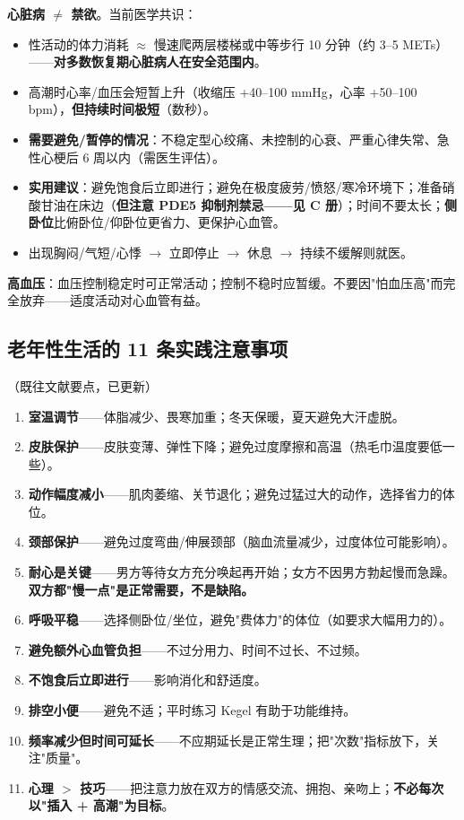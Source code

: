 \documentclass[12pt,UTF8,openany]{ctexbook}
\begin{document}
\textbf{心脏病 $\ne$ 禁欲}。当前医学共识：

\begin{itemize}[leftmargin=2em,itemsep=0.3em]
  \item 性活动的体力消耗 $\approx$ 慢速爬两层楼梯或中等步行 10 分钟（约 3--5 METs）——\textbf{对多数恢复期心脏病人在安全范围内}。
  \item 高潮时心率/血压会短暂上升（收缩压 +40--100 mmHg，心率 +50--100 bpm），\textbf{但持续时间极短}（数秒）。
  \item \textbf{需要避免/暂停的情况}：不稳定型心绞痛、未控制的心衰、严重心律失常、急性心梗后 6 周以内（需医生评估）。
  \item \textbf{实用建议}：避免饱食后立即进行；避免在极度疲劳/愤怒/寒冷环境下；准备硝酸甘油在床边（\textbf{但注意 PDE5 抑制剂禁忌——见 C 册}）；时间不要太长；\textbf{侧卧位}比俯卧位/仰卧位更省力、更保护心血管。
  \item 出现胸闷/气短/心悸 $\to$ 立即停止 $\to$ 休息 $\to$ 持续不缓解则就医。
\end{itemize}

\noindent\textbf{高血压}：血压控制稳定时可正常活动；控制不稳时应暂缓。不要因"怕血压高"而完全放弃——适度活动对心血管有益。

\subsection*{老年性生活的 11 条实践注意事项}（既往文献要点，已更新）

\begin{enumerate}[leftmargin=2em,itemsep=0.3em]
  \item \textbf{室温调节}——体脂减少、畏寒加重；冬天保暖，夏天避免大汗虚脱。
  \item \textbf{皮肤保护}——皮肤变薄、弹性下降；避免过度摩擦和高温（热毛巾温度要低一些）。
  \item \textbf{动作幅度减小}——肌肉萎缩、关节退化；避免过猛过大的动作，选择省力的体位。
  \item \textbf{颈部保护}——避免过度弯曲/伸展颈部（脑血流量减少，过度体位可能影响）。
  \item \textbf{耐心是关键}——男方等待女方充分唤起再开始；女方不因男方勃起慢而急躁。\textbf{双方都"慢一点"是正常需要，不是缺陷。}
  \item \textbf{呼吸平稳}——选择侧卧位/坐位，避免"费体力"的体位（如要求大幅用力的）。
  \item \textbf{避免额外心血管负担}——不过分用力、时间不过长、不过频。
  \item \textbf{不饱食后立即进行}——影响消化和舒适度。
  \item \textbf{排空小便}——避免不适；平时练习 Kegel 有助于功能维持。
  \item \textbf{频率减少但时间可延长}——不应期延长是正常生理；把"次数"指标放下，关注"质量"。
  \item \textbf{心理 $>$ 技巧}——把注意力放在双方的情感交流、拥抱、亲吻上；\textbf{不必每次以"插入 + 高潮"为目标}。
\end{enumerate}
\end{document}
